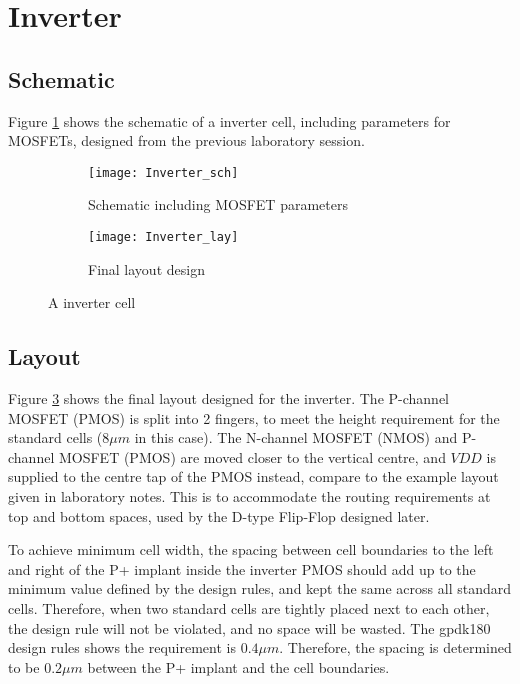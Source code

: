 \section{Inverter}

\subsection{Schematic}

Figure \ref{fig:inv_sch} shows the schematic of a inverter cell, including parameters for MOSFETs, designed from the previous laboratory session.

\begin{figure}[!htb]
	\centering
	\begin{subfigure}[b]{0.55\textwidth}
		\texttt{[image: Inverter\_sch]}
		\caption{Schematic including MOSFET parameters}
		\label{fig:inv_sch}
	\end{subfigure}
	\begin{subfigure}[b]{0.3\textwidth}
		\texttt{[image: Inverter\_lay]}
		\caption{Final layout design}
		\label{fig:inv_lay}
	\end{subfigure}
	\caption{A inverter cell}
\end{figure}

\subsection{Layout}

Figure \ref{fig:inv_lay} shows the final layout designed for the inverter. The P-channel MOSFET (PMOS) is split into 2 fingers, to meet the height requirement for the standard cells ($8 \mu m$ in this case). The N-channel MOSFET (NMOS) and P-channel MOSFET (PMOS) are moved closer to the vertical centre, and $VDD$ is supplied to the centre tap of the PMOS instead, compare to the example layout given in laboratory notes. This is to accommodate the routing requirements at top and bottom spaces, used by the D-type Flip-Flop designed later.

To achieve minimum cell width, the spacing between cell boundaries to the left and right of the P+ implant inside the inverter PMOS should add up to the minimum value defined by the design rules, and kept the same across all standard cells. Therefore, when two standard cells are tightly placed next to each other, the design rule will not be violated, and no space will be wasted. The gpdk180 design rules shows the requirement is $0.4 \mu m$. Therefore, the spacing is determined to be $0.2 \mu m$ between the P+ implant and the cell boundaries.

